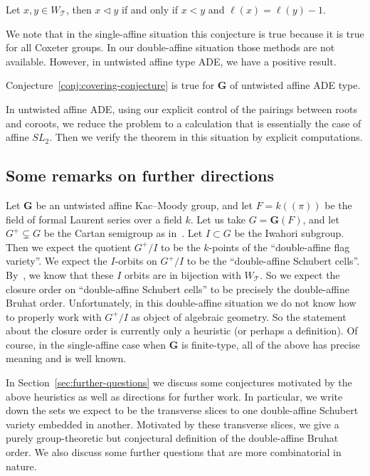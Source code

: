 \documentclass[ALCO,ThmDefs,Unicode]{cedram}
\newcommand{\bG}{\mathbf{G}}
\newcommand{\cT}{\mathcal{T}}
\newcommand{\WTits}{W_{\TitsCone}}
\newcommand{\TitsCone}{\cT}
\begin{document}
\begin{conj}\label{conj:covering-conjecture}
Let $x,y \in \WTits$, then $x \lhd y$ if and only if $x < y$ and $\ell(x) = \ell(y) - 1$.
\end{conj}

We note that in the single-affine situation this conjecture is true because it is true for all Coxeter groups. In our double-affine situation those methods are not available. However, in untwisted affine type ADE, we have a positive result.

\begin{theo}
Conjecture~\ref{conj:covering-conjecture} is true for $\bG$ of untwisted affine ADE type.
\end{theo}

In untwisted affine ADE, using our explicit control of the pairings between roots and coroots, we reduce the problem to a calculation that is essentially the case of affine $SL_2$. Then we verify the theorem in this situation by explicit computations.

\subsection{Some remarks on further directions}

Let $\bG$ be an untwisted affine Kac--Moody group, and let $F = k((\pi))$ be the field of formal Laurent series over a field $k$. Let us take $G = \bG(F)$, and let $G^+ \subsetneq G$ be the Cartan semigroup as in~\cite{BKP}. Let $I \subset G$ be the Iwahori subgroup. Then we expect the quotient $G^+/I$ to be the $k$-points of the ``double-affine flag variety''. We expect the $I$-orbits on $G^+/I$ to be the ``double-affine Schubert cells''. By~\cite{BKP}, we know that these $I$ orbits are in bijection with $\WTits$. So we expect the closure order on ``double-affine Schubert cells'' to be precisely the double-affine Bruhat order. Unfortunately, in this double-affine situation we do not know how to properly work with $G^+/I$ as object of algebraic geometry. So the statement about the closure order is currently only a heuristic (or perhaps a definition). Of course, in the single-affine case when $\bG$ is finite-type, all of the above has precise meaning and is well known.

In Section~\ref{sec:further-questions} we discuss some conjectures motivated by the above heuristics as well as directions for further work. In particular, we write down the sets we expect to be the transverse slices to one double-affine Schubert variety embedded in another. Motivated by these transverse slices, we give a purely group-theoretic but conjectural definition of the double-affine Bruhat order. We also discuss some further questions that are more combinatorial in nature.
\end{document}
